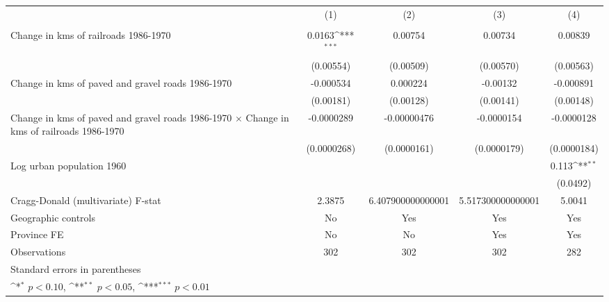 {
\def\sym#1{\ifmmode^{#1}\else\(^{#1}\)\fi}
\begin{tabular}{l*{4}{c}}
\hline\hline
                &\multicolumn{1}{c}{(1)}&\multicolumn{1}{c}{(2)}&\multicolumn{1}{c}{(3)}&\multicolumn{1}{c}{(4)}\\
                &\multicolumn{1}{c}{}&\multicolumn{1}{c}{}&\multicolumn{1}{c}{}&\multicolumn{1}{c}{}\\
\hline
Change in kms of railroads 1986-1970&   0.0163\sym{***}&  0.00754         &  0.00734         &  0.00839         \\
                &(0.00554)         &(0.00509)         &(0.00570)         &(0.00563)         \\
[1em]
Change in kms of paved and gravel roads 1986-1970&-0.000534         & 0.000224         & -0.00132         &-0.000891         \\
                &(0.00181)         &(0.00128)         &(0.00141)         &(0.00148)         \\
[1em]
Change in kms of paved and gravel roads 1986-1970 $\times$ Change in kms of railroads 1986-1970&-0.0000289         &-0.00000476         &-0.0000154         &-0.0000128         \\
                &(0.0000268)         &(0.0000161)         &(0.0000179)         &(0.0000184)         \\
[1em]
Log urban population 1960&                  &                  &                  &    0.113\sym{**} \\
                &                  &                  &                  & (0.0492)         \\
\hline
Cragg-Donald (multivariate) F-stat&   2.3875         &6.407900000000001         &5.517300000000001         &   5.0041         \\
Geographic controls&       No         &      Yes         &      Yes         &      Yes         \\
Province FE     &       No         &       No         &      Yes         &      Yes         \\
Observations    &      302         &      302         &      302         &      282         \\
\hline\hline
\multicolumn{5}{l}{\footnotesize Standard errors in parentheses}\\
\multicolumn{5}{l}{\footnotesize \sym{*} \(p<0.10\), \sym{**} \(p<0.05\), \sym{***} \(p<0.01\)}\\
\end{tabular}
}
